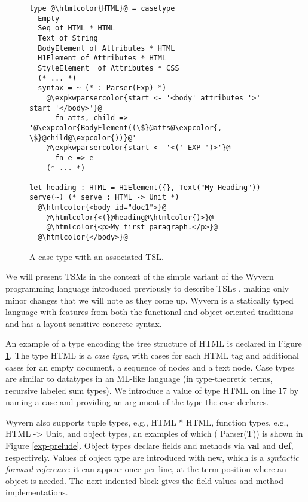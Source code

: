 \documentclass{sig-alternate}[10pt]
\makeatletter
\newcommand\BeraMonottfamily{%
  \def\fvm@Scale{0.85}%
  \fontfamily{fvm}\selectfont%
}
\newcommand{\htmlcolor}[1]{\textcolor[HTML]{339933}{#1}}
\newcommand{\expkwparsercolor}[1]{\textcolor[HTML]{336699}{#1}}
\newcommand{\expcolor}[1]{\textcolor[HTML]{FF0033}{#1}}
\newcommand{\mycaption}[1]{\vspace{-5px}\caption{#1}\vspace{-5px}}
\newcommand{\lstinlinew}[1]{{\scriptsize\BeraMonottfamily #1}}
\makeatother
\begin{document}
\begin{figure}[t!]
\begin{lstlisting}[style=wyvern]
type @\htmlcolor{HTML}@ = casetype 
  Empty
  Seq of HTML * HTML 
  Text of String
  BodyElement of Attributes * HTML
  H1Element of Attributes * HTML
  StyleElement  of Attributes * CSS
  (* ... *)
  syntax = ~ (* : Parser(Exp) *)
    @\expkwparsercolor{start <- '<body' attributes '>' start '</body>'}@
      fn atts, child => '@\expcolor{BodyElement((\$}@atts@\expcolor{, \$}@child@\expcolor{))}@'
    @\expkwparsercolor{start <- '<(' EXP ')>'}@
      fn e => e
    (* ... *)

let heading : HTML = H1Element({}, Text("My Heading"))
serve(~) (* serve : HTML -> Unit *)
  @\htmlcolor{<body id="doc1">}@
    @\htmlcolor{<(}@heading@\htmlcolor{)>}@
    @\htmlcolor{<p>My first paragraph.</p>}@
  @\htmlcolor{</body>}@
\end{lstlisting}
\mycaption{A case type with an associated TSL.}
\label{f-htmltype}
\end{figure}
We will present TSMs in the context of the simple variant of the Wyvern programming language introduced previously to describe TSLs  \cite{TSLs}, making only minor changes that we will note as they come up. Wyvern is a statically typed  language with features from both the functional and object-oriented traditions and has a layout-sensitive concrete syntax. 

An example of a type encoding the tree structure of HTML is declared in Figure \ref{f-htmltype}. The type \lstinlinew{HTML} is a \emph{case type}, with cases for each HTML tag and additional cases for an empty document, a sequence of nodes and a text node. Case types are similar to datatypes in an ML-like language (in type-theoretic terms, recursive labeled sum types). 
We introduce a value of type \lstinlinew{HTML} on line 17 by naming a case and providing an argument of the type the case declares.

Wyvern also supports tuple types, e.g., \lstinlinew{HTML * HTML}, function types, e.g., \lstinlinew{HTML -> Unit}, and object types, an examples of which (\lstinlinew{Parser(T)}) is shown in Figure \ref{exp-prelude}. Object types declare fields and methods via \lstinlinew{\textbf{val}} and \lstinlinew{\textbf{def}}, respectively. Values of object type are introduced with \lstinlinew{new}, which  is a  \emph{syntactic forward reference}: it can appear once per line, at the term position where an object is needed. The next indented block gives the field values and method implementations. %
\end{document}
